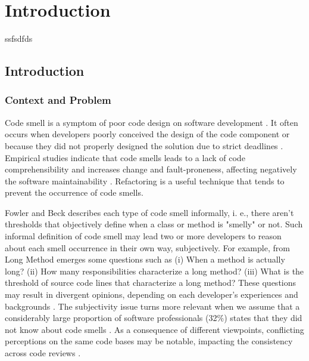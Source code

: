 \chapter{Introduction} 
ssfsdfds


\section{Introduction}
\label{sec:introduction}

\subsection{Context and Problem}

Code smell is a symptom of poor code design on software development \cite{fowler1999refactoring}. It often occurs when developers poorly conceived the design of the code component or because they did not properly designed the solution due to strict deadlines \cite{palomba2014they}. Empirical studies indicate that code smells leads to a lack of code comprehensibility \cite{abbes2011empirical} and increases change and fault-proneness, affecting negatively the software maintainability \cite{yamashita2013exploring}. Refactoring \cite{fowler1999refactoring} is a useful technique that tends to prevent the occurrence of code smells.

Fowler and Beck \cite{fowler1999refactoring} describes each type of code smell informally, i. e., there aren't thresholds that objectively define when a class or method is "smelly" or not. Such informal definition of code smell may lead two or more developers to reason about each smell occurrence in their own way, subjectively. For example, from Long Method emerges some questions such as (i) When a method is actually long? (ii) How many responsibilities characterize a long method? (iii) What is the threshold of source code lines that characterize a long method? These questions may result in divergent opinions, depending on each developer's experiences and backgrounds \cite{hozano2018you}. The subjectivity issue turns more relevant when we assume that a considerably large proportion of software professionals (32\%) states that they did not know about code smells \cite{yamashita2013developers}. As a consequence of different viewpoints, conflicting perceptions on the same code bases may be notable, impacting the consistency across code reviews \cite{hozano2018you}.

